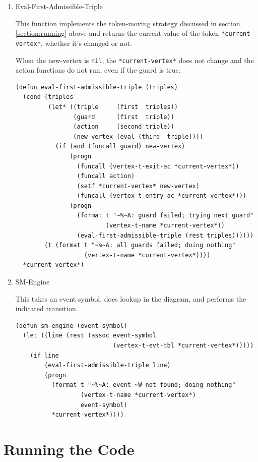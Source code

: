 \documentclass[10pt,oneside,x11names]{article}
\begin{document}
\begin{enumerate}
\item Eval-First-Admissible-Triple
\label{sec:org515d7a9}

This function implements the token-moving strategy discussed in section
\ref{section:running} above and returns the current value of the token
\texttt{*current-vertex*}, whether it's changed or not.

When the new-vertex is \texttt{nil}, the \texttt{*current-vertex*} does not change and the
action functions do not run, even if the guard is true.

\begin{verbatim}
(defun eval-first-admissible-triple (triples)
  (cond (triples
         (let* ((triple     (first  triples))
                (guard      (first  triple))
                (action     (second triple))
                (new-vertex (eval (third  triple))))
           (if (and (funcall guard) new-vertex)
               (progn
                 (funcall (vertex-t-exit-ac *current-vertex*))
                 (funcall action)
                 (setf *current-vertex* new-vertex)
                 (funcall (vertex-t-entry-ac *current-vertex*)))
               (progn
                 (format t "~%~A: guard failed; trying next guard"
                         (vertex-t-name *current-vertex*))
                 (eval-first-admissible-triple (rest triples))))))
        (t (format t "~%~A: all guards failed; doing nothing"
                   (vertex-t-name *current-vertex*))))
  *current-vertex*)
\end{verbatim}

\item SM-Engine
\label{sec:org819e878}

This takes an event symbol, does lookup in the diagram, and performs the
indicated transition.

\begin{verbatim}
(defun sm-engine (event-symbol)
  (let ((line (rest (assoc event-symbol
                           (vertex-t-evt-tbl *current-vertex*)))))
    (if line
        (eval-first-admissible-triple line)
        (progn
          (format t "~%~A: event ~W not found; doing nothing"
                  (vertex-t-name *current-vertex*)
                  event-symbol)
          *current-vertex*))))

\end{verbatim}
\end{enumerate}

\section{Running the Code}
\label{sec:orgebb2c30}
\end{document}
